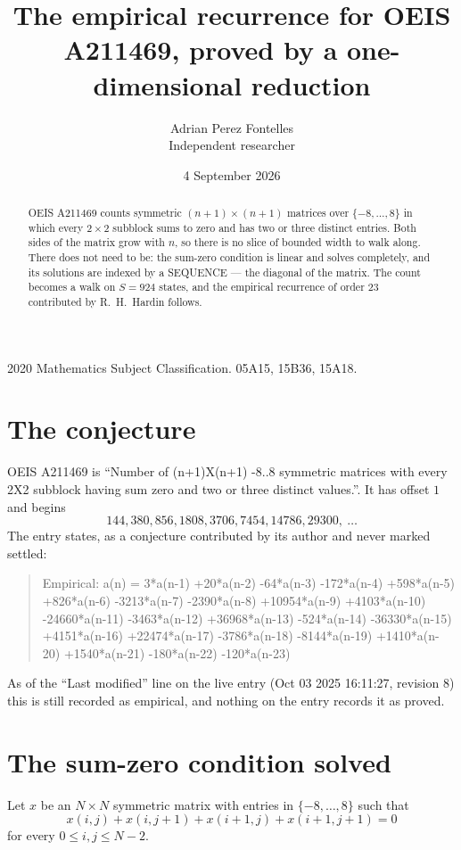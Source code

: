 \documentclass[11pt,a4paper]{article}
\title{The empirical recurrence for OEIS A211469, proved by a one-dimensional reduction}
\author{Adrian Perez Fontelles\\ \small Independent researcher}
\date{4 September 2026}
\theoremstyle{plain}
\theoremstyle{definition}
\begin{document}
\maketitle

\begin{abstract}
OEIS A211469 counts symmetric $(n+1)\times(n+1)$ matrices over
$\{-8,\dots,8\}$ in which every $2\times2$ subblock sums to zero and has two or three distinct
entries. Both sides of the matrix grow with $n$, so there is no slice of bounded width to walk
along. There does not need to be: the sum-zero condition is linear and solves completely, and
its solutions are indexed by a SEQUENCE --- the diagonal of the matrix. The count becomes a walk
on $S=924$ states, and the empirical recurrence of order $23$ contributed by R.~H.~Hardin
follows.
\end{abstract}

\noindent\small 2020 Mathematics Subject Classification. 05A15, 15B36, 15A18.\normalsize

\section{The conjecture}

OEIS A211469 is ``Number of (n+1)X(n+1) -8..8 symmetric matrices with every 2X2 subblock having sum zero and two or three distinct values.''. It has offset $1$ and begins
\[
144, 380, 856, 1808, 3706, 7454, 14786, 29300,\ \dots
\]
The entry states, as a conjecture contributed by its author and never marked settled:
\begin{quote}
Empirical: a(n) = 3*a(n-1) +20*a(n-2) -64*a(n-3) -172*a(n-4) +598*a(n-5) +826*a(n-6) -3213*a(n-7) -2390*a(n-8) +10954*a(n-9) +4103*a(n-10) -24660*a(n-11) -3463*a(n-12) +36968*a(n-13) -524*a(n-14) -36330*a(n-15) +4151*a(n-16) +22474*a(n-17) -3786*a(n-18) -8144*a(n-19) +1410*a(n-20) +1540*a(n-21) -180*a(n-22) -120*a(n-23)
\end{quote}
As of the ``Last modified'' line on the live entry (Oct 03 2025 16:11:27, revision 8) this is still
recorded as empirical, and nothing on the entry records it as proved.

\section{The sum-zero condition solved}

Let $x$ be an $N\times N$ symmetric matrix with entries in $\{-8,\dots,8\}$ such that
\[
x(i,j)+x(i,j{+}1)+x(i{+}1,j)+x(i{+}1,j{+}1)=0
\]
for every $0\le i,j\le N-2$.
\end{document}

